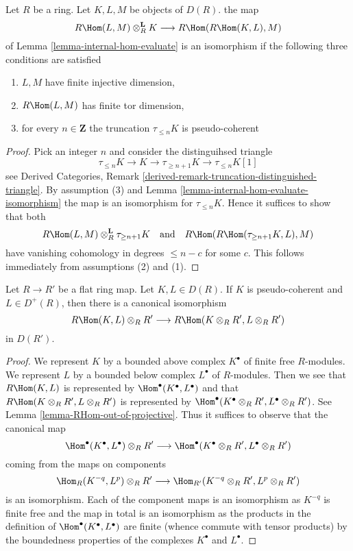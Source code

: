 \begin{lemma}
\label{lemma-internal-hom-evaluate-isomorphism-technical}
Let $R$ be a ring. Let $K, L, M$ be objects of $D(R)$.
the map
$$
R\Hom(L, M) \otimes_R^\mathbf{L} K \longrightarrow R\Hom(R\Hom(K, L), M)
$$
of Lemma \ref{lemma-internal-hom-evaluate} is an isomorphism
if the following three conditions are satisfied
\begin{enumerate}
\item $L, M$ have finite injective dimension,
\item $R\Hom(L, M)$ has finite tor dimension,
\item for every $n \in \mathbf{Z}$ the truncation $\tau_{\leq n}K$
is pseudo-coherent
\end{enumerate}
\end{lemma}

\begin{proof}
Pick an integer $n$ and consider the distinguihsed triangle
$$
\tau_{\leq n}K \to K \to \tau_{\geq n + 1}K \to \tau_{\leq n}K[1]
$$
see Derived Categories, Remark
\ref{derived-remark-truncation-distinguished-triangle}.
By assumption (3) and Lemma \ref{lemma-internal-hom-evaluate-isomorphism}
the map is an isomorphism for $\tau_{\leq n}K$. Hence it
suffices to show that both
$$
R\Hom(L, M) \otimes_R^\mathbf{L} \tau_{\geq n + 1}K
\quad\text{and}\quad
R\Hom(R\Hom(\tau_{\geq n + 1}K, L), M)
$$
have vanishing cohomology in degrees $\leq n - c$ for some $c$.
This follows immediately from assumptions (2) and (1).
\end{proof}

\begin{lemma}
\label{lemma-base-change-RHom}
Let $R \to R'$ be a flat ring map. Let $K, L \in D(R)$.
If $K$ is pseudo-coherent and $L \in D^{+}(R)$, then
there is a canonical isomorphism
$$
R\Hom(K, L) \otimes_R R'
\longrightarrow
R\Hom(K \otimes_R R', L \otimes_R R')
$$
in $D(R')$.
\end{lemma}

\begin{proof}
We represent $K$ by a bounded above complex $K^\bullet$ of finite
free $R$-modules. We represent $L$ by a bounded below complex $L^\bullet$
of $R$-modules. Then we see that
$R\Hom(K, L)$ is represented by $\Hom^\bullet(K^\bullet, L^\bullet)$
and that
$R\Hom(K \otimes_R R', L \otimes_R R')$
is represented by
$\Hom^\bullet(K^\bullet \otimes_R R', L^\bullet \otimes_R R')$.
See Lemma \ref{lemma-RHom-out-of-projective}.
Thus it suffices to observe that the canonical map
$$
\Hom^\bullet(K^\bullet, L^\bullet) \otimes_R R'
\longrightarrow
\Hom^\bullet(K^\bullet \otimes_R R', L^\bullet \otimes_R R')
$$
coming from the maps on components
$$
\Hom_R(K^{-q}, L^p) \otimes_R R'
\longrightarrow
\Hom_{R'}(K^{-q} \otimes_R R', L^p \otimes_R R')
$$
is an isomorphism. Each of the component maps is an isomorphism
as $K^{-q}$ is finite free and the map in total is an isomorphism
as the products in the definition of $\Hom^\bullet(K^\bullet, L^\bullet)$
are finite (whence commute with tensor products)
by the boundedness properties of the complexes $K^\bullet$
and $L^\bullet$.
\end{proof}

